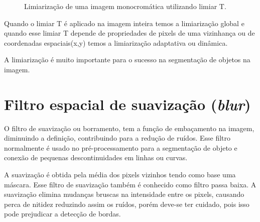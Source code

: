 \begin{figure}[h]
 \centering
    \qquad
   \caption{ Limiarização de uma imagem monocromática utilizando limiar T. \cite{pdi99}}
  \label{subfig:limiarizacao}
\end{figure}

Quando o limiar T é aplicado na imagem inteira temos a limiarização global e quando esse limiar T depende de propriedades de pixels de uma vizinhança ou de coordenadas espaciais(x,y) temos a limiarização adaptativa ou dinâmica.\cite{digitalImgProcess2010}

A limiarização é muito importante para o sucesso na segmentação de objetos na imagem.

\section{Filtro espacial de suavização (\textit{blur})}
\label{sec:blur}

O filtro de suavização ou borramento, tem a função de embaçamento na imagem, diminuindo a definição, contribuindo para a redução de ruídos. Esse filtro normalmente é usado no pré-processamento para a segmentação de objeto e conexão de pequenas descontinuidades em linhas ou curvas.\cite{digitalImgProcess2010}

A suavização é obtida pela média dos pixels vizinhos tendo como base uma máscara. Esse filtro de suavização também é conhecido como filtro passa baixa. A suavização elimina mudanças bruscas na intensidade entre os pixels, causando perca de nitidez reduzindo assim os ruídos, porém deve-se ter cuidado, pois isso pode prejudicar a detecção de bordas.

